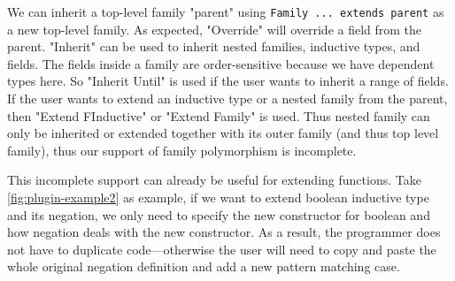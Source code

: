 We can inherit a top-level family "parent" using \texttt{Family
... extends parent} as a new top-level family. As expected, "Override"
will override a field from the parent. "Inherit" can be used to inherit
nested families, inductive types, and fields. The fields inside a family
are order-sensitive because we have dependent types here. So "Inherit
Until" is used if the user wants to inherit a range of fields. If the
user wants to extend an inductive type or a nested family from the
parent, then "Extend FInductive" or "Extend Family" is used. Thus nested
family can only be inherited or extended together with its outer family
(and thus top level family), thus our support of family polymorphism is
incomplete.

This incomplete support can already be useful for extending functions.
Take \cref{fig:plugin-example2} as example, if we want to extend boolean
inductive type and its negation, we only need to specify the new
constructor for boolean and how negation deals with the new constructor.
As a result, the programmer does not have to duplicate code---otherwise
the user will need to copy and paste the whole original negation
definition and add a new pattern matching case.
